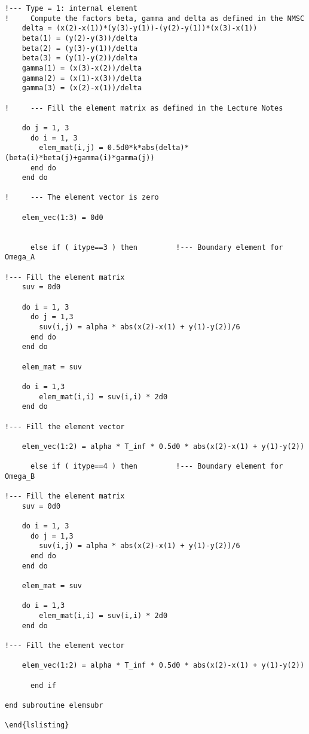 \begin{lstlisting}
!--- Type = 1: internal element
!	  Compute the factors beta, gamma and delta as defined in the NMSC
	delta = (x(2)-x(1))*(y(3)-y(1))-(y(2)-y(1))*(x(3)-x(1))
	beta(1) = (y(2)-y(3))/delta
	beta(2) = (y(3)-y(1))/delta
	beta(3) = (y(1)-y(2))/delta
	gamma(1) = (x(3)-x(2))/delta
	gamma(2) = (x(1)-x(3))/delta
	gamma(3) = (x(2)-x(1))/delta
	
!     --- Fill the element matrix as defined in the Lecture Notes

	do j = 1, 3
	  do i = 1, 3
	    elem_mat(i,j) = 0.5d0*k*abs(delta)*(beta(i)*beta(j)+gamma(i)*gamma(j))
	  end do
	end do
	
!     --- The element vector is zero
  
	elem_vec(1:3) = 0d0
	
	
      else if ( itype==3 ) then   		!--- Boundary element for Omega_A
	
!--- Fill the element matrix
	suv = 0d0
	
	do i = 1, 3
	  do j = 1,3
	    suv(i,j) = alpha * abs(x(2)-x(1) + y(1)-y(2))/6
	  end do
	end do
	
	elem_mat = suv
	
	do i = 1,3
	    elem_mat(i,i) = suv(i,i) * 2d0
	end do
	
!--- Fill the element vector

	elem_vec(1:2) = alpha * T_inf * 0.5d0 * abs(x(2)-x(1) + y(1)-y(2))
	
      else if ( itype==4 ) then   		!--- Boundary element for Omega_B
	
!--- Fill the element matrix
	suv = 0d0
	
	do i = 1, 3
	  do j = 1,3
	    suv(i,j) = alpha * abs(x(2)-x(1) + y(1)-y(2))/6
	  end do
	end do
	
	elem_mat = suv
	
	do i = 1,3
	    elem_mat(i,i) = suv(i,i) * 2d0
	end do
	
!--- Fill the element vector

	elem_vec(1:2) = alpha * T_inf * 0.5d0 * abs(x(2)-x(1) + y(1)-y(2))
	
      end if
      
end subroutine elemsubr

\end{lslisting}


\end{lstlisting}
